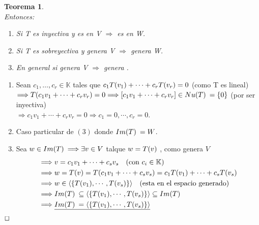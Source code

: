 \documentclass[]{article}
\newtheorem{theorem}{Teorema}
\newenvironment{proof}{\noindent{\bf Prueba:}}{$\hfill \Box$ \vspace{10pt}}
\newcommand{\K}{
    \mathbb{K}
}
\newcommand{\ida}{\Longrightarrow}
\begin{document}
\begin{theorem}
    \\
    Entonces:
    \begin{enumerate}
        \item Si T es inyectiva y  es \li en V
        $\ida$  es \li en W.
        \item Si T es sobreyectiva y  genera V $\ida$
         genera W.
        \item En general si  genera V $\ida$
         genera \I.
    \end{enumerate}
\end{theorem}
\begin{proof}
    \begin{enumerate}
        \item Sean $c_1,\dots,c_r \in \K$ tales que $c_1\text{$T({v_1})$}+\cdots+c_r\text{$T({v_r})$}=0$ (como T es lineal)\\
        $\ida \T{c_1v_1+\cdots+c_rv_r}=0 \ida [c_1v_1+\cdots+c_rv_r] \in \N=\conjunto{0}$ (por ser inyectiva)\\
        $\ida c_1v_1+\cdots+c_rv_r=0 \ida c_1=0,\cdots,c_r=0$.
        \item Caso particular de $(3)$ donde $\text{$Im(T)$}\:=W$.
        \item Sea $w \in \I \ida \exists v \in V$ talque $w=\text{$T({v})$}$ , como  genera $V$
        \begin{align*}
            &\ida v= c_1v_1+\cdots+c_sv_s \quad \text{(con $c_i \in \K$)}\\
            &\ida w=\T{v}=\T{c_1v_1+\cdots+c_sv_s}=c_1\T{v_1}+\cdots+c_s\T{v_s}\\
            &\ida w \in \espgen{\conjunto{\T{v_1},\cdots,\T{v_s}}} \quad \text{(esta en el espacio generado)}\\
            &\ida \I \subseteq \espgen{\conjunto{\T{v_1},\cdots,\T{v_s}}} \subseteq \I\\
            &\ida \underline{\I=\espgen{\conjunto{\T{v_1},\cdots,\T{v_s}}}}  
        \end{align*}
    \end{enumerate}
\end{proof}
\end{document}
